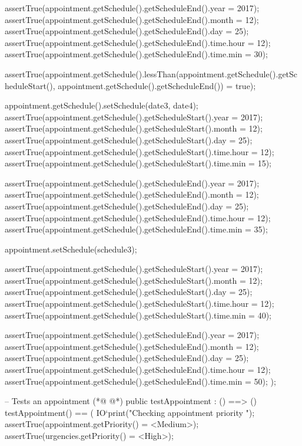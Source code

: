 \begin{vdmpp}[breaklines=true]
   assertTrue(appointment.getSchedule().getScheduleEnd().year = 2017);
   assertTrue(appointment.getSchedule().getScheduleEnd().month = 12);
   assertTrue(appointment.getSchedule().getScheduleEnd().day = 25);
   assertTrue(appointment.getSchedule().getScheduleEnd().time.hour = 12);
   assertTrue(appointment.getSchedule().getScheduleEnd().time.min = 30);
   
   assertTrue(appointment.getSchedule().lessThan(appointment.getSchedule().getScheduleStart(), appointment.getSchedule().getScheduleEnd()) = true);
   
   appointment.getSchedule().setSchedule(date3, date4);
   assertTrue(appointment.getSchedule().getScheduleStart().year = 2017);
   assertTrue(appointment.getSchedule().getScheduleStart().month = 12);
   assertTrue(appointment.getSchedule().getScheduleStart().day = 25);
   assertTrue(appointment.getSchedule().getScheduleStart().time.hour = 12);
   assertTrue(appointment.getSchedule().getScheduleStart().time.min = 15);
   
   assertTrue(appointment.getSchedule().getScheduleEnd().year = 2017);
   assertTrue(appointment.getSchedule().getScheduleEnd().month = 12);
   assertTrue(appointment.getSchedule().getScheduleEnd().day = 25);
   assertTrue(appointment.getSchedule().getScheduleEnd().time.hour = 12);
   assertTrue(appointment.getSchedule().getScheduleEnd().time.min = 35);
   
   appointment.setSchedule(schedule3);
   
   assertTrue(appointment.getSchedule().getScheduleStart().year = 2017);
   assertTrue(appointment.getSchedule().getScheduleStart().month = 12);
   assertTrue(appointment.getSchedule().getScheduleStart().day = 25);
   assertTrue(appointment.getSchedule().getScheduleStart().time.hour = 12);
   assertTrue(appointment.getSchedule().getScheduleStart().time.min = 40);
   
   assertTrue(appointment.getSchedule().getScheduleEnd().year = 2017);
   assertTrue(appointment.getSchedule().getScheduleEnd().month = 12);
   assertTrue(appointment.getSchedule().getScheduleEnd().day = 25);
   assertTrue(appointment.getSchedule().getScheduleEnd().time.hour = 12);
   assertTrue(appointment.getSchedule().getScheduleEnd().time.min = 50);
  );
 
 -- Tests an appointment
(*@
\label{testAppointment:188}
@*)
 public testAppointment : () ==> ()
  testAppointment() == (
   IO`print("\n Checking appointment priority \n");
   assertTrue(appointment.getPriority() = <Medium>);
   assertTrue(urgencies.getPriority() = <High>);
   

\end{vdmpp}
